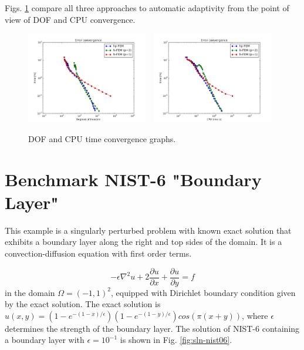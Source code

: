 \documentclass[12pt]{elsarticle}
\begin{document}
Figs. \ref{fig:nist-5-conv} compare all
three approaches to automatic adaptivity from the point
of view of DOF and CPU convergence.

\begin{figure}[H]
\centering
\vspace{-3mm}
\includegraphics[height=4cm]{nist/nist-5/conv_dof_aniso.png}\ \
\includegraphics[height=4cm]{nist/nist-5/conv_cpu_aniso.png}
\caption{DOF and CPU time convergence graphs.}
\label{fig:nist-5-conv}
\end{figure}


\section{Benchmark NIST-6 "Boundary Layer"}
\label{sec:bench-6}

This example is a singularly perturbed problem with known exact solution that exhibits
a boundary layer along the right and top sides of the domain.
It is a convection-diffusion equation with first order terms.

\begin{equation} \label{boundary-layer}
-\epsilon \nabla^{2} u + 2\frac{\partial u}{\partial x} + \frac{\partial u}{\partial y} = f
\end{equation}
in the domain $\Omega = (-1, 1)^2$, equipped with Dirichlet boundary condition
given by the exact solution. The exact solution is
$u(x,y) = (1 - e^{-(1 - x) / \epsilon})(1 - e^{-(1 - y) / \epsilon})cos(\pi (x + y))$,
where $\epsilon$ determines the strength of the boundary layer.
The solution of NIST-6 containing a boundary layer
with $\epsilon = 10^{-1}$ is shown in Fig. \ref{fig:sln-nist06}.
\end{document}
